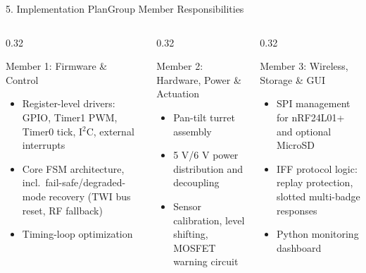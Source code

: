 \documentclass[aspectratio=169, 10pt]{beamer}
\begin{document}
\begin{frame}{5. Implementation Plan}{Group Member Responsibilities}
    \begin{columns}[T]
        \begin{column}{0.32\textwidth}
            \begin{block}{Member 1: Firmware \& Control}
                \small
                \begin{itemize}
                    \item Register-level drivers: GPIO, Timer1 PWM, Timer0 tick, I$^2$C, external interrupts
                    \item Core FSM architecture, incl.\ fail-safe/degraded-mode recovery (TWI bus reset, RF fallback)
                    \item Timing-loop optimization
                \end{itemize}
            \end{block}
        \end{column}
        \begin{column}{0.32\textwidth}
            \begin{block}{Member 2: Hardware, Power \& Actuation}
                \small
                \begin{itemize}
                    \item Pan-tilt turret assembly
                    \item 5 V/6 V power distribution and decoupling
                    \item Sensor calibration, level shifting, MOSFET warning circuit
                \end{itemize}
            \end{block}
        \end{column}
        \begin{column}{0.32\textwidth}
            \begin{block}{Member 3: Wireless, Storage \& GUI}
                \small
                \begin{itemize}
                    \item SPI management for nRF24L01+ and optional MicroSD
                    \item IFF protocol logic: replay protection, slotted multi-badge responses
                    \item Python monitoring dashboard
                \end{itemize}
            \end{block}
        \end{column}
    \end{columns}
\end{frame}
\end{document}
